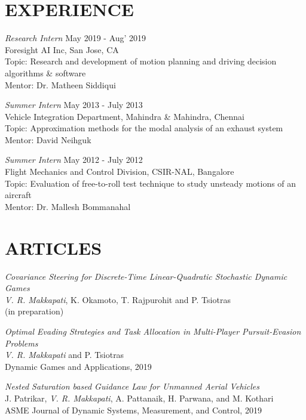 \documentclass[margin, 10pt]{res} %
\begin{document}
\begin{resume}
\section{EXPERIENCE}

{\sl Research Intern} \hfill May 2019 - Aug' 2019\\
Foresight AI Inc, San Jose, CA \\
Topic: Research and development of motion planning and driving decision algorithms \& software\\
Mentor: Dr. Matheen Siddiqui

{\sl Summer Intern} \hfill May 2013 - July 2013 \\
Vehicle Integration Department, Mahindra \& Mahindra, Chennai \\
Topic: Approximation methods for the modal analysis of an exhaust system\\
Mentor: David Neihguk

{\sl Summer Intern} \hfill May 2012 - July 2012 \\
Flight Mechanics and Control Division, CSIR-NAL, Bangalore \\
Topic: Evaluation of free-to-roll test technique to study unsteady motions of an aircraft \\
Mentor: Dr. Mallesh Bommanahal


\section{ARTICLES} 
{\sl Covariance Steering for Discrete-Time Linear-Quadratic Stochastic Dynamic Games} \\
\textit{V. R. Makkapati}, K. Okamoto, T. Rajpurohit and P. Tsiotras \\
(in preparation)

{\sl Optimal Evading Strategies and Task Allocation in Multi-Player Pursuit-Evasion Problems} \\
\textit{V. R. Makkapati} and P. Tsiotras \\
Dynamic Games and Applications, 2019

{\sl Nested Saturation based Guidance Law for Unmanned Aerial Vehicles} \\
J. Patrikar, \textit{V. R. Makkapati}, A. Pattanaik, H. Parwana, and M. Kothari \\
ASME Journal of Dynamic Systems, Measurement, and Control, 2019


\end{resume}
\end{document}
